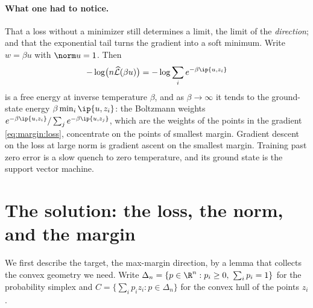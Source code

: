 \begin{refsection}
\paragraph{What one had to notice.} That a loss without a minimizer still determines a limit, the limit of the \emph{direction}; and that the exponential tail turns the gradient into a soft minimum. Write $w=\beta u$ with $\norm u=1$. Then
\[
  -\log\bigl(n\Lhat(\beta u)\bigr)=-\log\sum_ie^{-\beta\ip{u,z_i}}
\]
is a free energy at inverse temperature $\beta$, and as $\beta\to\infty$ it tends to the ground-state energy $\beta\min_i\ip{u,z_i}$: the Boltzmann weights $e^{-\beta\ip{u,z_i}}/\sum_je^{-\beta\ip{u,z_j}}$, which are the weights of the points in the gradient \eqref{eq:margin:loss}, concentrate on the points of smallest margin. Gradient descent on the loss at large norm is gradient ascent on the smallest margin. Training past zero error is a slow quench to zero temperature, and its ground state is the support vector machine.

\section{The solution: the loss, the norm, and the margin}\label{sec:margin:solution}

We first describe the target, the max-margin direction, by a lemma that collects the convex geometry we need. Write $\Delta_n=\{p\in\R^n:p_i\ge0,\ \sum_ip_i=1\}$ for the probability simplex and $C=\{\sum_ip_iz_i:p\in\Delta_n\}$ for the convex hull of the points $z_i$.



\end{refsection}
